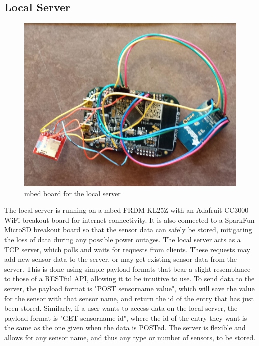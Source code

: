 \documentclass[10pt,twocolumn]{article}
\begin{document}
\subsection*{Local Server}
\begin{figure}[h]
  \centering
    \includegraphics[scale=0.3]{server.png}
  \caption{mbed board for the local server}
  \label{fig:local_server}
\end{figure}
The local server is running on a mbed FRDM-KL25Z with an Adafruit CC3000 WiFi breakout board for internet connectivity. It is also connected to a SparkFun MicroSD breakout board so that the sensor data can safely be stored, mitigating the loss of data during any possible power outages. The local server acts as a TCP server, which polls and waits for requests from clients. These requests may add new sensor data to the server, or may get existing sensor data from the server. This is done using simple payload formats that bear a slight resemblance to those of a RESTful API, allowing it to be intuitive to use. To send data to the server, the payload format is "POST sensorname value", which will save the value for the sensor with that sensor name, and return the id of the entry that has just been stored. Similarly, if a user wants to access data on the local server, the payload format is "GET sensorname id", where the id of the entry they want is the same as the one given when the data is POSTed. The server is flexible and allows for any sensor name, and thus any type or number of sensors, to be stored. 
\end{document}
